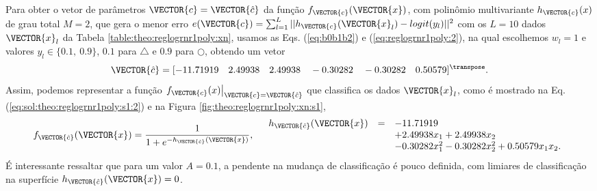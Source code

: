 \begin{SolutionT}\label{sol:theo:reglogrnr1poly:s1}
Para obter o vetor de parâmetros $\VECTOR{c}=\VECTOR{\hat{c}}$ da função $f_{\VECTOR{c}}(\VECTOR{x})$, 
com polinômio multivariante $h_{\VECTOR{c}}(x)$ de grau total $M=2$,
que gera o menor erro $e(\VECTOR{c}) =  \sum_{l=1}^{L} ||h_{\VECTOR{c}}(\VECTOR{x}_l)-logit(y_l)||^2$
com os $L=10$ dados $\VECTOR{x}_l$ da Tabela \ref{table:theo:reglogrnr1poly:xn},
usamos as Eqs. (\ref{eq:b0b1b2}) e  (\ref{eq:reglogrnr1poly:2}), na qual escolhemos $w_l=1$ e valores $y_l \in \{0.1,~ 0.9\}$,
$0.1$ para $\bigtriangleup$ e $0.9$ para $\bigcirc$, 
obtendo um vetor 
\begin{equation}
\VECTOR{\hat{c}}=[-11.71919\quad 2.49938\quad 2.49938\quad -0.30282\quad -0.30282\quad 0.50579]^{\transpose}.
\end{equation}
Assim, podemos representar a função $\left.f_{\VECTOR{c}}(x)\right|_{\VECTOR{c}=\VECTOR{\hat{c}}}$ 
que classifica os dados $\VECTOR{x}_l$, 
como é mostrado na Eq. (\ref{eq:sol:theo:reglogrnr1poly:s1:2}) e na Figura \ref{fig:theo:reglogrnr1poly:xn:s1},
\begin{equation}\label{eq:sol:theo:reglogrnr1poly:s1:2}
f_{\VECTOR{\hat{c}}}(\VECTOR{x})= \frac{1}{1+e^{-h_{\VECTOR{\hat{c}}}(\VECTOR{x})}},
\quad
\begin{array}{lll}
h_{\VECTOR{\hat{c}}}(\VECTOR{x}) & = & -11.71919\\
                         ~ & ~ & +2.49938 x_1 +2.49938 x_2 \\
                         ~ & ~ & -0.30282 x_1^2 -0.30282  x_2^2 + 0.50579 x_1 x_2.
\end{array}
\end{equation}
É interessante ressaltar que para um valor $A=0.1$, a pendente na mudança de classificação é pouco definida,
com limiares de classificação na superfície $h_{\VECTOR{\hat{c}}}(\VECTOR{x})=0$.
\end{SolutionT}

